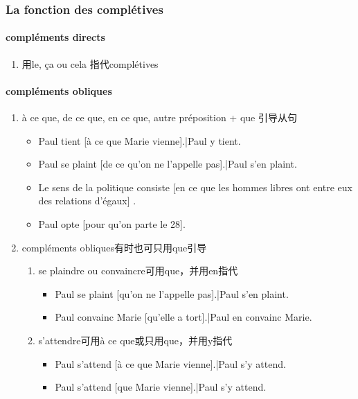 \documentclass[UTF8]{report}
\begin{document}
\subsubsection{La fonction des complétives}
\paragraph{compléments directs}
\begin{enumerate}
    \item 用le, ça ou cela 指代complétives
\end{enumerate}

\paragraph{compléments obliques}
\begin{enumerate}
    \item à ce que, de ce que, en ce que, autre préposition + que 引导从句
    \begin{itemize}
        \item Paul tient [à ce que Marie vienne].|Paul y tient.
        \item Paul se plaint [de ce qu’on ne l’appelle pas].|Paul s’en plaint.
        \item  Le sens de la politique consiste [en ce que les hommes libres ont entre eux des relations d’égaux] .
        \item Paul opte [pour qu’on parte le 28].
    \end{itemize}
    \item compléments obliques有时也可只用que引导
    \begin{enumerate}
        \item se plaindre ou convaincre可用que，并用en指代
        \begin{itemize}
            \item Paul se plaint [qu’on ne l’appelle pas].|Paul s’en plaint.
            \item Paul convainc Marie [qu’elle a tort].|Paul en convainc Marie.
        \end{itemize}
        \item s’attendre可用à ce que或只用que，并用y指代
        \begin{itemize}
            \item Paul s’attend [à ce que Marie vienne].|Paul s’y attend.
            \item Paul s’attend [que Marie vienne].|Paul s’y attend.
        \end{itemize}
    \end{enumerate}
\end{enumerate}
\end{document}
